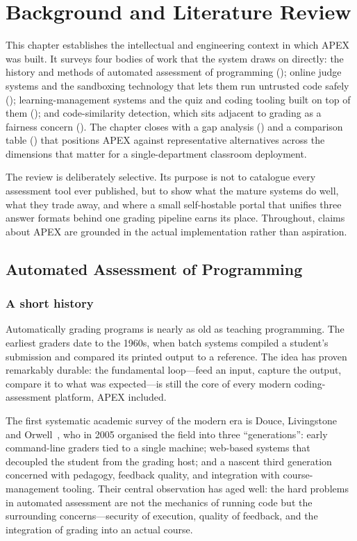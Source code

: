 \chapter{Background and Literature Review}\label{ch:ch02}

This chapter establishes the intellectual and engineering context in which APEX was
built. It surveys four bodies of work that the system draws on directly: the history and
methods of automated assessment of programming (); online judge
systems and the sandboxing technology that lets them run untrusted code safely
(); learning-management systems and the quiz and coding tooling built
on top of them (); and code-similarity detection, which sits adjacent to
grading as a fairness concern (). The chapter closes with a gap
analysis () and a comparison table () that
positions APEX against representative alternatives across the dimensions that matter for a
single-department classroom deployment.

The review is deliberately selective. Its purpose is not to catalogue every assessment
tool ever published, but to show what the mature systems do well, what they trade away,
and where a small self-hostable portal that unifies three answer formats behind one
grading pipeline earns its place. Throughout, claims about APEX are grounded in the actual
implementation rather than aspiration.

\section{Automated Assessment of Programming}\label{sec:bg-autoassess}

\subsection{A short history}

Automatically grading programs is nearly as old as teaching programming. The earliest
graders date to the 1960s, when batch systems compiled a student's submission and compared
its printed output to a reference. The idea has proven remarkably durable: the fundamental
loop---feed an input, capture the output, compare it to what was expected---is still the
core of every modern coding-assessment platform, APEX included.

The first systematic academic survey of the modern era is Douce, Livingstone and
Orwell~\cite{douce2005autoassess}, who in 2005 organised the field into three
``generations'': early command-line graders tied to a single machine; web-based systems
that decoupled the student from the grading host; and a nascent third generation
concerned with pedagogy, feedback quality, and integration with course-management tooling.
Their central observation has aged well: the hard problems in automated assessment are not
the mechanics of running code but the surrounding concerns---security of execution, quality
of feedback, and the integration of grading into an actual course.

